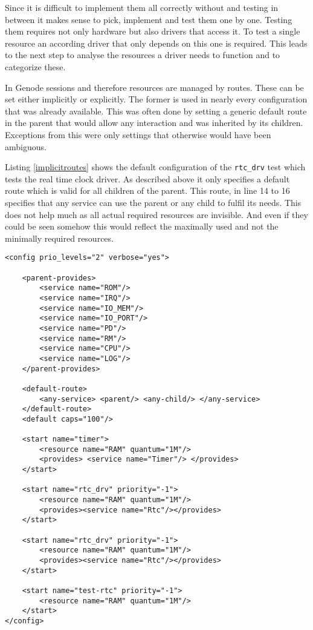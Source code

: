 \documentclass[
a4paper,
12pt,
notitlepage,
parskip=half,
DIV=11,
]{scrbook}
\begin{document}
		Since it is difficult to implement them all correctly without and testing in between it makes sense to pick, implement and test them one by one.
		Testing them requires not only hardware but also drivers that access it.
		To test a single resource an according driver that only depends on this one is required.
		This leads to the next step to analyse the resources a driver needs to function and to categorize these.
		
		In Genode sessions and therefore resources are managed by routes.
		These can be set either implicitly or explicitly.
		The former is used in nearly every configuration that was already available.
		This was often done by setting a generic default route in the parent that would allow any interaction and was inherited by its children.
		Exceptions from this were only settings that otherwise would have been ambiguous.
		
		Listing \ref{implicitroutes} shows the default configuration of the \texttt{rtc\_drv} test which tests the real time clock driver.
		As described above it only specifies a default route which is valid for all children of the parent.
		This route, in line 14 to 16 specifies that any service can use the parent or any child to fulfil its needs.
		This does not help much as all actual required resources are invisible.
		And even if they could be seen somehow this would reflect the maximally used and not the minimally required resources.
		
		\begin{lstlisting}[basicstyle=\ttfamily\footnotesize]
<config prio_levels="2" verbose="yes">
		
	<parent-provides>
		<service name="ROM"/>
		<service name="IRQ"/>
		<service name="IO_MEM"/>
		<service name="IO_PORT"/>
		<service name="PD"/>
		<service name="RM"/>
		<service name="CPU"/>
		<service name="LOG"/>
	</parent-provides>
		
	<default-route>
		<any-service> <parent/> <any-child/> </any-service>
	</default-route>
	<default caps="100"/>
		
	<start name="timer">
		<resource name="RAM" quantum="1M"/>
		<provides> <service name="Timer"/> </provides>
	</start>
		
	<start name="rtc_drv" priority="-1">
		<resource name="RAM" quantum="1M"/>
		<provides><service name="Rtc"/></provides>
	</start>
		
	<start name="rtc_drv" priority="-1">
		<resource name="RAM" quantum="1M"/>
		<provides><service name="Rtc"/></provides>
	</start>
		
	<start name="test-rtc" priority="-1">
		<resource name="RAM" quantum="1M"/>
	</start>
</config>
		\end{lstlisting}
		
\end{document}
